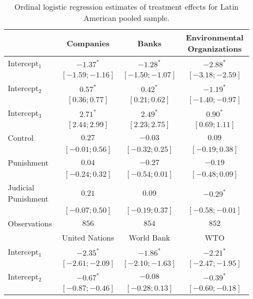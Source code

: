 \begin{table}[h]
\begin{center}
\caption{Ordinal logistic regression estimates of treatment effects for Latin American pooled sample.}
\begin{threeparttable}
\begin{tabular}{l c c c}
\hline
 & Companies & Banks & Environmental
Organizations \\
\hline
Intercept$_1$       & $-1.37^{*}$       & $-1.28^{*}$       & $-2.88^{*}$       \\
                    & $ [-1.59; -1.16]$ & $ [-1.50; -1.07]$ & $ [-3.18; -2.59]$ \\
Intercept$_2$       & $0.57^{*}$        & $0.42^{*}$        & $-1.19^{*}$       \\
                    & $ [ 0.36;  0.77]$ & $ [ 0.21;  0.62]$ & $ [-1.40; -0.97]$ \\
Intercept$_3$       & $2.71^{*}$        & $2.49^{*}$        & $0.90^{*}$        \\
                    & $ [ 2.44;  2.99]$ & $ [ 2.23;  2.75]$ & $ [ 0.69;  1.11]$ \\
Control             & $0.27$            & $-0.03$           & $0.09$            \\
                    & $ [-0.01;  0.56]$ & $ [-0.32;  0.25]$ & $ [-0.19;  0.38]$ \\
Punishment          & $0.04$            & $-0.27$           & $-0.19$           \\
                    & $ [-0.24;  0.32]$ & $ [-0.54;  0.01]$ & $ [-0.48;  0.09]$ \\
Judicial Punishment & $0.21$            & $0.09$            & $-0.29^{*}$       \\
                    & $ [-0.07;  0.50]$ & $ [-0.19;  0.37]$ & $ [-0.58; -0.01]$ \\
\hline
Observations        & $856$             & $854$             & $852$             \\
\hline
 & United Nations & World Bank & WTO \\
\hline
Intercept$_1$       & $-2.35^{*}$       & $-1.86^{*}$       & $-2.21^{*}$       \\
                    & $ [-2.61; -2.09]$ & $ [-2.10; -1.63]$ & $ [-2.47; -1.95]$ \\
Intercept$_2$       & $-0.67^{*}$       & $-0.08$           & $-0.39^{*}$       \\
                    & $ [-0.87; -0.46]$ & $ [-0.28;  0.13]$ & $ [-0.60; -0.18]$ \\

\end{tabular}
\end{threeparttable}
\end{center}
\end{table}
